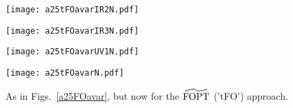 \documentclass[aps,nofootinbib,showkeys,noshowpacs,preprintnumbers,amsmath,amssymb]{revtex4}
\begin{document}
\begin{figure}[htb] %
\begin{minipage}[b]{.49\linewidth}
\texttt{[image: a25tFOavarIR2N.pdf]}
\end{minipage}
\begin{minipage}[b]{.49\linewidth}
\texttt{[image: a25tFOavarIR3N.pdf]}
\end{minipage}
\begin{minipage}[b]{.49\linewidth}
\texttt{[image: a25tFOavarUV1N.pdf]}
\end{minipage}
\begin{minipage}[b]{.49\linewidth}
\texttt{[image: a25tFOavarN.pdf]}
\end{minipage}
\caption{As in Figs.~\ref{a25FOavar}, but now for the ${\widetilde{\rm FOPT}}$ ('tFO') approach.}
\label{a25tFOavar}
\end{figure}
\end{document}
